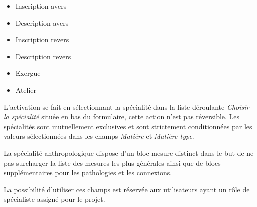 \documentclass[letterpaper,10pt,french]{sphinxmanual}
\begin{document}
\begin{itemize}
\begin{description}
\begin{itemize}
\item {} 
Inscription avers

\item {} 
Description avers

\item {} 
Inscription revers

\item {} 
Description revers

\item {} 
Exergue

\item {} 
Atelier

\end{itemize}

\end{description}

\end{itemize}

L'activation se fait en sélectionnant la spécialité dans la liste déroulante \emph{Choisir la spécialité} située en bas du formulaire, cette action n'est pas réversible. Les spécialités sont mutuellement exclusives et sont strictement conditionnées par les valeurs sélectionnées dans les champs \emph{Matière} et \emph{Matière type}.

La spécialité anthropologique dispose d'un bloc mesure distinct dans le but de ne pas surcharger la liste des mesures les plus générales ainsi que de blocs supplémentaires pour les pathologies et les connexions.

La possibilité d'utiliser ces champs est réservée aux utilisateurs ayant un rôle de spécialiste assigné pour le projet.
\end{document}
